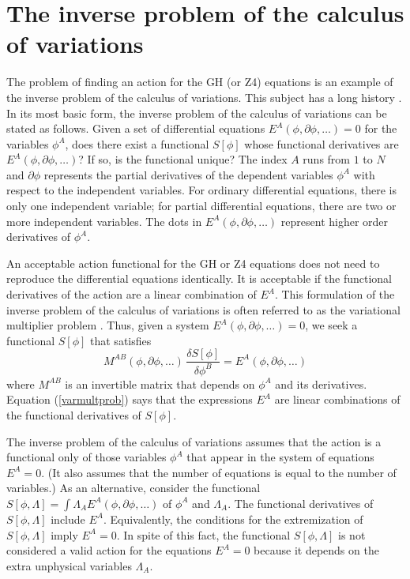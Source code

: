 \documentclass[letterpaper,nofootinbib,prd,amsmath,twocolumn]{revtex4-1}
\begin{document}
\appendix*
\section{The inverse problem of the calculus of variations}
The problem of finding an action for the GH (or Z4) equations is an example of the 
inverse problem of the calculus of variations. 
This subject has a long history \cite{AndersonThompson}. In its most basic form, the inverse problem 
of the calculus of variations can be stated as follows. Given a set of differential 
equations $E^A(\phi,\partial\phi,\ldots) = 0$ for the variables $\phi^A$, does there exist a functional 
$S[\phi]$ whose functional derivatives are $E^A(\phi,\partial\phi,\ldots)$? If so, is the 
functional unique? The index $A$ runs from $1$ to $N$ and  $\partial\phi$ represents 
the partial derivatives of the dependent variables $\phi^A$ with respect to the independent variables. 
For ordinary differential equations, there is only one independent variable; for 
partial differential equations, there are two or more independent variables. 
The dots in  $E^A(\phi,\partial\phi,\ldots)$ represent higher order derivatives of $\phi^A$. 

An acceptable action functional for the GH or Z4 equations does not need to reproduce the differential equations 
identically. It is  
acceptable if the functional derivatives of the action are a linear combination of $E^A$. 
This formulation of the inverse problem of the calculus of variations is often referred to as the 
variational multiplier problem \cite{AndersonThompson,Henneaux}. Thus, given a 
system $E^A(\phi,\partial\phi,\ldots) = 0$, we seek a functional $S[\phi]$ that satisfies 
\begin{equation}\label{varmultprob}
     M^{AB}(\phi,\partial\phi,\ldots) \,\frac{\delta S[\phi]}{\delta\phi^B} = E^A(\phi,\partial\phi,\ldots)
\end{equation}
where $M^{AB}$ is an invertible matrix  that depends on $\phi^A$ and its derivatives. 
Equation (\ref{varmultprob}) says that the expressions $E^A$ are linear combinations 
of the functional derivatives of $S[\phi]$.

The inverse problem of the calculus of variations assumes that the action is a functional only of 
those variables $\phi^A$ that appear in the system of equations $E^A = 0$. (It also assumes that 
the number of equations is equal to the number of variables.) 
As an alternative, consider the functional $S[\phi,\Lambda] = \int \Lambda_A E^A(\phi,\partial\phi,\ldots)$ 
of $\phi^A$ and $\Lambda_A$. The functional derivatives of $S[\phi,\Lambda]$ 
include $E^A$. Equivalently, the conditions for the extremization of $S[\phi,\Lambda]$ 
imply $E^A = 0$. In spite of this fact, the functional 
$S[\phi,\Lambda]$ is not considered a valid action for the equations $E^A = 0$ because it 
depends on the extra unphysical variables $\Lambda_A$. 
\end{document}
